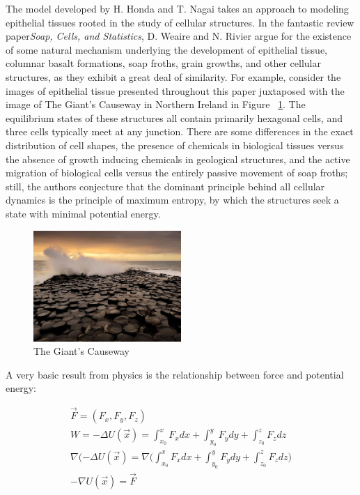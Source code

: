 The model developed by H. Honda and T. Nagai takes an approach to modeling epithelial tissues rooted in the study of cellular structures.  In the fantastic review paper\emph{Soap, Cells, and Statistics}, D. Weaire and N. Rivier argue for the existence of some natural mechanism underlying the development of epithelial tissue, columnar basalt formations, soap froths, grain growths, and other cellular structures, as they exhibit a great deal of similarity. For example, consider the images of epithelial tissue presented throughout this paper juxtaposed with the image of The Giant's Causeway in Northern Ireland in Figure ~\ref{fig:cause}. The equilibrium states of these structures all contain primarily hexagonal cells, and three cells typically meet at any junction. There are some differences in the exact distribution of cell shapes, the presence of chemicals in biological tissues versus the absence of growth inducing chemicals in geological structures, and the active migration of biological cells versus the entirely passive movement of soap froths; still, the authors conjecture that the dominant principle behind all cellular dynamics is the principle of maximum entropy, by which the structures seek a state with minimal potential energy.

\begin{figure}[h]
\centering
\includegraphics[width=0.5\textwidth]{../diagrams/resize_giant.jpg}
\caption{The Giant's Causeway}
\label{fig:cause}
\end{figure}

A very basic result from physics is the relationship between force and potential energy:

\begin{gather}
\vec{F} = (F_x, F_y, F_z)\\
W = -\Delta U(\vec{x}) = \int_{x_0}^xF_xdx+\int_{y_0}^yF_ydy+\int_{z_0}^zF_zdz\\
\nabla(-\Delta U(\vec{x}) = \nabla\Bigg(\int_{x_0}^xF_xdx+\int_{y_0}^yF_ydy+\int_{z_0}^zF_zdz\Bigg)\\
-\nabla U(\vec{x}) = \vec{F}
\end{gather}

